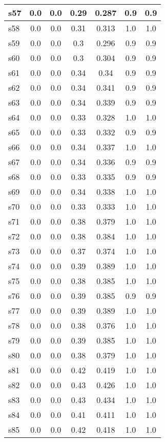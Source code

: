 \documentclass{article}
\begin{document}
\begin{tabular}{|l|c|c|c|c|c|c|}
\hline
s57 &0.0 & 0.0 & 0.29 & 0.287 & 0.9 & 0.9\\
\hline
s58 &0.0 & 0.0 & 0.31 & 0.313 & 1.0 & 1.0\\
\hline
s59 &0.0 & 0.0 & 0.3 & 0.296 & 0.9 & 0.9\\
\hline
s60 &0.0 & 0.0 & 0.3 & 0.304 & 0.9 & 0.9\\
\hline
s61 &0.0 & 0.0 & 0.34 & 0.34 & 0.9 & 0.9\\
\hline
s62 &0.0 & 0.0 & 0.34 & 0.341 & 0.9 & 0.9\\
\hline
s63 &0.0 & 0.0 & 0.34 & 0.339 & 0.9 & 0.9\\
\hline
s64 &0.0 & 0.0 & 0.33 & 0.328 & 1.0 & 1.0\\
\hline
s65 &0.0 & 0.0 & 0.33 & 0.332 & 0.9 & 0.9\\
\hline
s66 &0.0 & 0.0 & 0.34 & 0.337 & 1.0 & 1.0\\
\hline
s67 &0.0 & 0.0 & 0.34 & 0.336 & 0.9 & 0.9\\
\hline
s68 &0.0 & 0.0 & 0.33 & 0.335 & 0.9 & 0.9\\
\hline
s69 &0.0 & 0.0 & 0.34 & 0.338 & 1.0 & 1.0\\
\hline
s70 &0.0 & 0.0 & 0.33 & 0.333 & 1.0 & 1.0\\
\hline
s71 &0.0 & 0.0 & 0.38 & 0.379 & 1.0 & 1.0\\
\hline
s72 &0.0 & 0.0 & 0.38 & 0.384 & 1.0 & 1.0\\
\hline
s73 &0.0 & 0.0 & 0.37 & 0.374 & 1.0 & 1.0\\
\hline
s74 &0.0 & 0.0 & 0.39 & 0.389 & 1.0 & 1.0\\
\hline
s75 &0.0 & 0.0 & 0.38 & 0.385 & 1.0 & 1.0\\
\hline
s76 &0.0 & 0.0 & 0.39 & 0.385 & 0.9 & 0.9\\
\hline
s77 &0.0 & 0.0 & 0.39 & 0.389 & 1.0 & 1.0\\
\hline
s78 &0.0 & 0.0 & 0.38 & 0.376 & 1.0 & 1.0\\
\hline
s79 &0.0 & 0.0 & 0.39 & 0.385 & 1.0 & 1.0\\
\hline
s80 &0.0 & 0.0 & 0.38 & 0.379 & 1.0 & 1.0\\
\hline
s81 &0.0 & 0.0 & 0.42 & 0.419 & 1.0 & 1.0\\
\hline
s82 &0.0 & 0.0 & 0.43 & 0.426 & 1.0 & 1.0\\
\hline
s83 &0.0 & 0.0 & 0.43 & 0.434 & 1.0 & 1.0\\
\hline
s84 &0.0 & 0.0 & 0.41 & 0.411 & 1.0 & 1.0\\
\hline
s85 &0.0 & 0.0 & 0.42 & 0.418 & 1.0 & 1.0\\

\end{tabular}
\end{document}
